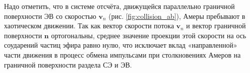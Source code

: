Надо отметить, что в системе отсчёта, движущейся параллельно граничной поверхности ЭВ со скоростью \(\mathbf{v}_n\) (рис. \ref{fig:collision_ab}), Амеры пребывают в хаотическом движении. Так как вектор скорости потока \(\mathbf{v}_n\) и вектор граничной поверхности \(\mathbf{n}\) ортогональны, среднее значение проекции этой скорости на ось соударений частиц эфира равно нулю, что исключает вклад «направленной» части движения в процесс обмена импульсами при столкновениях Амеров на граничной поверхности раздела СЭ и ЭВ.
